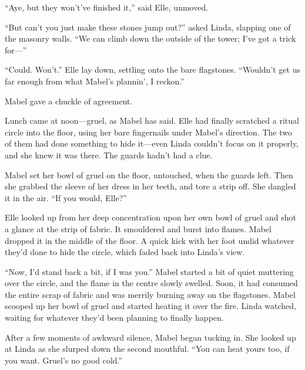 ``Aye, but they won't've finished it,'' said Elle, unmoved.



``But can't you just make these stones jump out?'' asked Linda, slapping one of the masonry walls.
``We can climb down the outside of the tower; I've got a trick for---''

``Could.
Won't.''
Elle lay down, settling onto the bare flagstones.
``Wouldn't get us far enough from what Mabel's plannin', I reckon.''

Mabel gave a chuckle of agreement.

\storybreak

Lunch came at noon---gruel, as Mabel has said.
Elle had finally scratched a ritual circle into the floor, using her bare fingernails under Mabel's direction.
The two of them had done something to hide it---even Linda couldn't focus on it properly, and she knew it was there.
The guards hadn't had a clue.

Mabel set her bowl of gruel on the floor, untouched, when the guards left.
Then she grabbed the sleeve of her dress in her teeth, and tore a strip off.
She dangled it in the air.
``If you would, Elle?''

Elle looked up from her deep concentration upon her own bowl of gruel and shot a glance at the strip of fabric.
It smouldered and burst into flames.
Mabel dropped it in the middle of the floor.
A quick kick with her foot undid whatever they'd done to hide the circle, which faded back into Linda's view.

``Now, I'd stand back a bit, if I was you.''
Mabel started a bit of quiet muttering over the circle, and the flame in the centre slowly swelled.
Soon, it had consumed the entire scrap of fabric and was merrily burning away on the flagstones.
Mabel scooped up her bowl of gruel and started heating it over the fire.
Linda watched, waiting for whatever they'd been planning to finally happen.

After a few moments of awkward silence, Mabel began tucking in.
She looked up at Linda as she slurped down the second mouthful.
``You can heat yours too, if you want.
Gruel's no good cold.''

